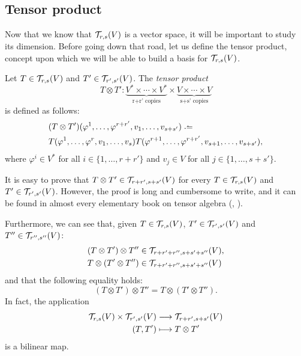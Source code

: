\subsection{Tensor product}

Now that we know that ${\mathcal T}_{r,s}(V)$ is a vector space, it will be important to study its dimension. Before going down that road, let us define the tensor product, concept upon which we will be able to build a basis for ${\mathcal T}_{r,s}(V)$.

\begin{definition}
	Let $T \in {\mathcal T}_{r,s}(V)$ and $T' \in {\mathcal T}_{r',s'}(V)$. The \emph{tensor product} \[T \otimes T' \colon \underbrace{V^* \times \cdots \times V^*}_{\text{r+r' copies}} \times \underbrace{V \times \cdots \times V}_{\text{s+s' copies}}\] is defined as follows:
	\begin{align*}
		&(T \otimes T')(\varphi^1, \dots, \varphi^{r+r'}, v_1, \dots, v_{s+s'}) \defeq \\
		&T(\varphi^1, \dots, \varphi^r, v_1, \dots, v_s) T(\varphi^{r+1}, \dots, \varphi^{r+r'}, v_{s+1}, \dots, v_{s+s'}),
	\end{align*}
	where $\varphi^i \in V^*$ for all $i \in \{1,\dots,r+r'\}$ and $v_j \in V$ for all $j \in \{1,\dots,s+s'\}$.
\end{definition}

It is easy to prove that $T \otimes T' \in {\mathcal T}_{r+r',s+s'}(V)$ for every $T \in {\mathcal T}_{r,s}(V)$ and $T' \in {\mathcal T}_{r',s'}(V)$. However, the proof is long and cumbersome to write, and it can be found in almost every elementary book on tensor algebra (\cite{romero86}, \cite{nomizu79}).

Furthermore, we can see that, given $T \in {\mathcal T}_{r,s}(V)$, $T' \in {\mathcal T}_{r',s'}(V)$ and $T'' \in {\mathcal T}_{r'',s''}(V)$:
\begin{align*}
	(T \otimes T') \otimes T'' &\in {\mathcal T}_{r+r'+r'', s+s'+s''}(V),\\
	T \otimes (T' \otimes T'') &\in {\mathcal T}_{r+r'+r'', s+s'+s''}(V)
\end{align*}
and that the following equality holds:
\[
	(T \otimes T') \otimes T'' = T \otimes (T' \otimes T'').
\]
In fact, the application
\begin{align*}
	{\mathcal T}_{r,s}(V) \times {\mathcal T}_{r',s'}(V) &\longrightarrow {\mathcal T}_{r+r',s+s'}(V) \\
	(T,T') &\longmapsto T \otimes T'
\end{align*}
is a bilinear map.

